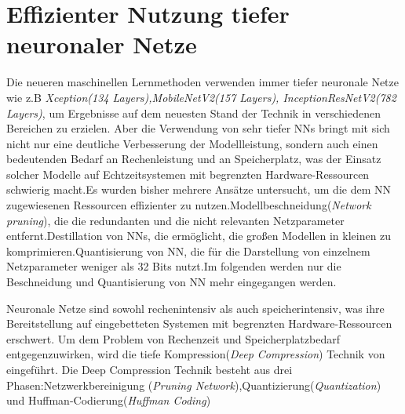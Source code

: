\documentclass[12pt,a4paper]{scrartcl}
\numberwithin{equation}{section}
\begin{document}
\section{Effizienter Nutzung tiefer neuronaler Netze}
  Die neueren maschinellen Lernmethoden verwenden immer tiefer neuronale Netze wie z.B \textit{Xception(134 Layers),MobileNetV2(157 Layers), InceptionResNetV2(782 Layers)}, um Ergebnisse auf dem neuesten Stand der Technik in verschiedenen Bereichen zu erzielen. Aber die Verwendung von sehr tiefer \acsp{NN} bringt mit sich nicht nur eine deutliche Verbesserung der Modellleistung, sondern auch einen bedeutenden Bedarf an Rechenleistung und an Speicherplatz, was der Einsatz solcher Modelle auf Echtzeitsystemen mit begrenzten Hardware-Ressourcen schwierig macht.Es wurden bisher mehrere Ansätze untersucht, um die dem \ac{NN} zugewiesenen Ressourcen effizienter zu nutzen.Modellbeschneidung(\textit{Network pruning}), die die redundanten und  die nicht relevanten Netzparameter entfernt.Destillation von \acsp{NN}, die ermöglicht, die großen Modellen in kleinen  zu komprimieren.Quantisierung von \ac{NN}, die für die Darstellung von einzelnem Netzparameter weniger als 32 Bits nutzt.Im folgenden werden nur die Beschneidung und Quantisierung von \ac{NN} mehr eingegangen werden.

  Neuronale Netze sind sowohl rechenintensiv als auch speicherintensiv, was ihre Bereitstellung auf eingebetteten Systemen mit begrenzten Hardware-Ressourcen erschwert\cite{5}. 
  Um dem Problem von Rechenzeit und Speicherplatzbedarf entgegenzuwirken, wird die tiefe Kompression(\textit{Deep Compression}) Technik von \cite[Han et al]{5} eingeführt.
  Die Deep Compression Technik besteht aus drei Phasen:Netzwerkbereinigung (\textit{Pruning Network}),Quantizierung(\textit{Quantization}) und Huffman-Codierung(\textit{Huffman Coding})
  
\end{document}

